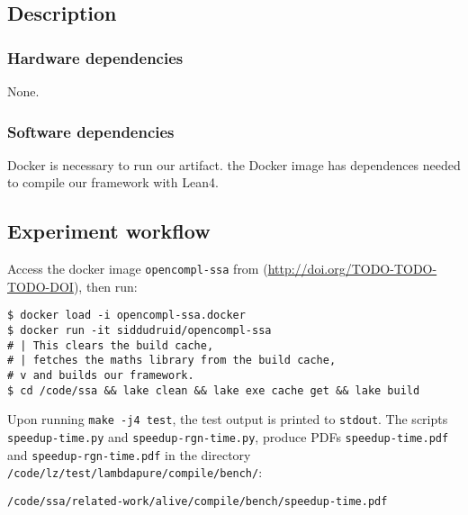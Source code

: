 \documentclass{sigplanconf}
\begin{document}
\subsection{Description}

\subsubsection{Hardware dependencies}

None.

\subsubsection{Software dependencies}

Docker is necessary to run our artifact. the Docker image has dependences needed to compile our framework with Lean4.



\subsection{Experiment workflow}

Access the docker image \texttt{opencompl-ssa} from
(\url{http://doi.org/TODO-TODO-TODO-DOI}), then run:

\begin{verbatim}
$ docker load -i opencompl-ssa.docker
$ docker run -it siddudruid/opencompl-ssa
# | This clears the build cache,
# | fetches the maths library from the build cache,
# v and builds our framework.
$ cd /code/ssa && lake clean && lake exe cache get && lake build
\end{verbatim}


Upon running \texttt{make -j4 test}, the test output is printed to \texttt{stdout}.
The scripts \texttt{speedup-time.py} and \texttt{speedup-rgn-time.py},
produce PDFs \texttt{speedup-time.pdf} and \texttt{speedup-rgn-time.pdf}
in the directory \texttt{/code/lz/test/lambdapure/compile/bench/}:

\begin{verbatim}
/code/ssa/related-work/alive/compile/bench/speedup-time.pdf
\end{verbatim}
\end{document}
